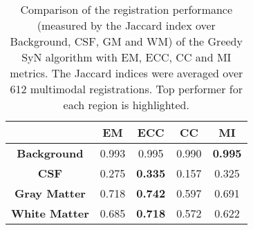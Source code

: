 \begin{table}[htbp]
  \centering
  {\small
    \begin{tabular}{ccccc}
    \toprule
          & \textbf{EM} & \textbf{ECC} & \textbf{CC} & \textbf{MI} \\
    \midrule
    \textbf{Background} & 0.993 & 0.995 & 0.990 & \textbf{0.995} \\
    \textbf{CSF} & 0.275 & \textbf{0.335} & 0.157 & 0.325 \\
    \textbf{Gray Matter} & 0.718 & \textbf{0.742} & 0.597 & 0.691 \\
    \textbf{White Matter} & 0.685 & \textbf{0.718} & 0.572 & 0.622 \\
    \bottomrule
    \end{tabular}}%
  \caption{{\small Comparison of the registration performance (measured by the Jaccard index over Background, CSF, GM and WM) of the Greedy SyN algorithm with EM, ECC, CC and MI metrics. The Jaccard indices were averaged over 612 multimodal registrations. Top performer for each region is highlighted.}}
  \label{tab:multimodal_results_segTri_fill}%
\end{table}%
